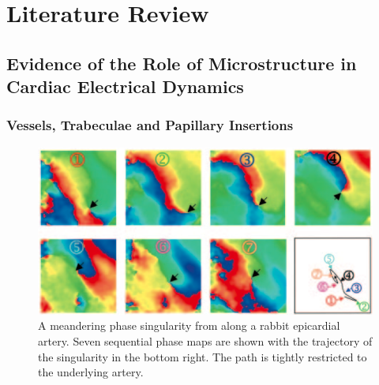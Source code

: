 \chapter{Literature Review}
\dblspace
\begin{quote}{\em }\end{quote}

\section{Evidence of the Role of Microstructure in Cardiac Electrical Dynamics} %
\label{sec:microstructure_has_profound_macroscopic_effects_on_propagation_dynamics}
  
  \subsection{Vessels, Trabeculae and Papillary Insertions} %
  \label{sub:vessels_trabeculae_and_papillary_insertions}
    \begin{figure}[htbp]
  		\centering
  		\includegraphics[width=1\textwidth]{Ch4/Figs/valderrabano}
      \caption{A meandering phase singularity from \cite{Valderrabano2003} along a rabbit epicardial artery. Seven sequential phase maps are shown with the trajectory of the singularity in the bottom right. The path is tightly restricted to the underlying artery.}
  		\label{fig:meandering}
  	\end{figure}
    
